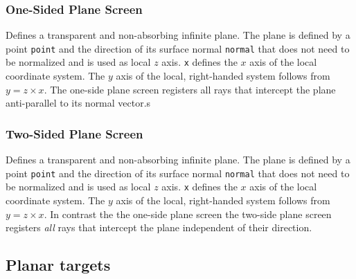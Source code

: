 \documentclass[10pt,a4paper,titlepage]{article}
\begin{document}
\subsubsection{One-Sided Plane Screen}






\vspace{0.25cm}
Defines a transparent and non-absorbing infinite plane. The plane is defined by a point {\tt point} and the direction of its surface normal {\tt normal} that does not need to be normalized and is used as local $z$ axis. {\tt x} defines the $x$ axis of the local coordinate system. The $y$ axis of the local, right-handed system follows from $y=z \times x$. The one-side plane screen registers all rays that intercept the plane anti-parallel to its normal vector.s


\subsubsection{Two-Sided Plane Screen}






\vspace{0.25cm}
Defines a transparent and non-absorbing infinite plane. The plane is defined by a point {\tt point} and the direction of its surface normal {\tt normal} that does not need to be normalized and is used as local $z$ axis. {\tt x} defines the $x$ axis of the local coordinate system. The $y$ axis of the local, right-handed system follows from $y=z \times x$. In contrast the the one-side plane screen the two-side plane screen registers \emph{all} rays that intercept the plane independent of their direction.


\subsection{Planar targets}
\end{document}
